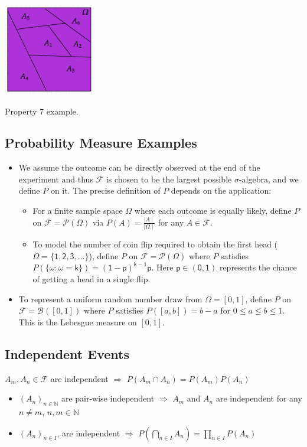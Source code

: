 \documentclass{tufte-handout}
\begin{document}
\begin{marginfigure}
\centering
\includegraphics[width=4cm]{fig/venn2.png}
\caption{ Property 7 example.
}
\end{marginfigure}



\subsection{Probability Measure Examples}

\begin{itemize}
\item We assume the outcome can be directly observed at the end of the experiment and thus $\mathscr F$ is chosen to be the largest possible $\sigma$-algebra, and we define $P$ on it. The precise definition of $P$ depends on the application:
\begin{itemize}  
\item For a finite sample space $\Omega$ where each outcome is equally likely, define $P$ on $\mathscr F = \mathscr P(\Omega)$ via $P(A)= \frac{\mid A\mid}{\mid \Omega \mid}$ for any $A \in \mathscr F$.
\item To model the number of coin flip required to obtain the first head ($\Omega = \mathsf{\{1,2,3,...\}}$), define $P$ on $\mathscr F = \mathscr P(\Omega)$ where $P$ satisfies $P(\{\omega: \omega=\mathsf k\})=\mathsf{(1-p)^{k-1}p}$. Here $\mathsf{p\in(0,1)}$ represents the chance of getting a head in a single flip.
\end{itemize}
\item To represent a uniform random number draw from $\Omega = [0, 1]$, define $P$ on $\mathscr F = \mathcal B([0, 1])$ where $P$ satisfies $P([a, b]) = b-a$ for $0 \le a \le b \le 1$. This is the Lebesgue measure on $[0, 1]$.
\end{itemize}

\subsection{Independent Events}
$A_m, A_n\in \mathscr F$ are independent $\Longrightarrow$ $P(A_m\cap A_n) = P(A_m)P(A_n)$
\begin{itemize}
\item $(A_n)_{n \in \mathbb N}$  are pair-wise independent $\Longrightarrow$ $A_m$ and $A_n$ are independent for any $n \neq m$, $n,m \in \mathbb N$
\item $(A_n)_{n \in I}$,   are independent $\Longrightarrow$ $P(\bigcap_{n \in  I} A_n) = \prod_{n \in  I}P(A_n)$
\end{itemize}
\end{document}
